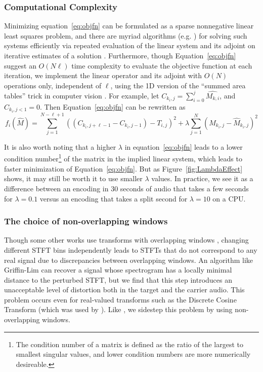 \documentclass[runningheads]{llncs}
\begin{document}
\subsubsection{Computational Complexity}
\label{sec:computation}
Minimizing equation~\ref{eq:objfn} can be formulated as a sparse nonnegative linear least squares problem, and there are myriad algorithms (e.g. \cite{branch1999subspace}) for solving such systems efficiently via repeated evaluation of the linear system and its adjoint on iterative estimates of a solution .  Furthermore, though Equation~\ref{eq:objfn} suggest an $O(N \ell)$ time complexity to evaluate the objective function at each iteration, we implement the linear operator and its adjoint with $O(N)$ operations only, independent of $\ell$, using the 1D version of the ``summed area tables'' trick in computer vision \cite{lewisfast}.  For example, let $C_{k_i, j} = \sum_{i=0}^{j} \hat{M_{k, i}}$, and $C_{k_i, j < 1} = 0$.  Then Equation~\ref{eq:objfn} can be rewritten as 
\begin{equation}
  \label{eq:objfncumusum}
  f_i(\hat{M}) = \sum_{j=1}^{N-\ell+1} \left( (C_{k_i, j+\ell-1}-C_{k_i, j-1}) - T_{i, j} \right)^2 + \lambda \sum_{j=1}^N \left( M_{k_i, j} - \hat{M}_{k_i, j} \right)^2
\end{equation}


It is also worth noting that a higher $\lambda$ in equation~\ref{eq:objfn} leads to a lower condition number\footnote{The condition number of a matrix is defined as the ratio of the largest to smallest singular values, and lower condition numbers are more numerically desireable.} of the matrix in the implied linear system, which leads to faster minimization of Equation~\ref{eq:objfn}.  But as Figure~\ref{fig:LambdaEffect} shows, it may still be worth it to use smaller $\lambda$ values.  In practice, we see it as a difference between an encoding in 30 seconds of audio that takes a few seconds for $\lambda=0.1$ versus an encoding that takes a split second for $\lambda=10$ on a CPU.



\subsubsection{The choice of non-overlapping windows}
Though some other works use transforms with overlapping windows \cite{hwan_sik_yun_acoustic_2010,geleta_pixinwav_2021}, changing different STFT bins independently leads to STFTs that do not correspond to any real signal due to discrepancies between overlapping windows.  An algorithm like Griffin-Lim \cite{griffin1984signal} can recover a signal whose spectrogram has a locally minimal distance to the perturbed STFT, but we find that this step introduces an unacceptable level of distortion both in the target and the carrier audio.  This problem occurs even for real-valued transforms such as the Discrete Cosine Transform (which was used by \cite{geleta_pixinwav_2021}).  Like \cite{xiaoxiao_dong_data_2004}, we sidestep this problem by using non-overlapping windows.  
\end{document}
